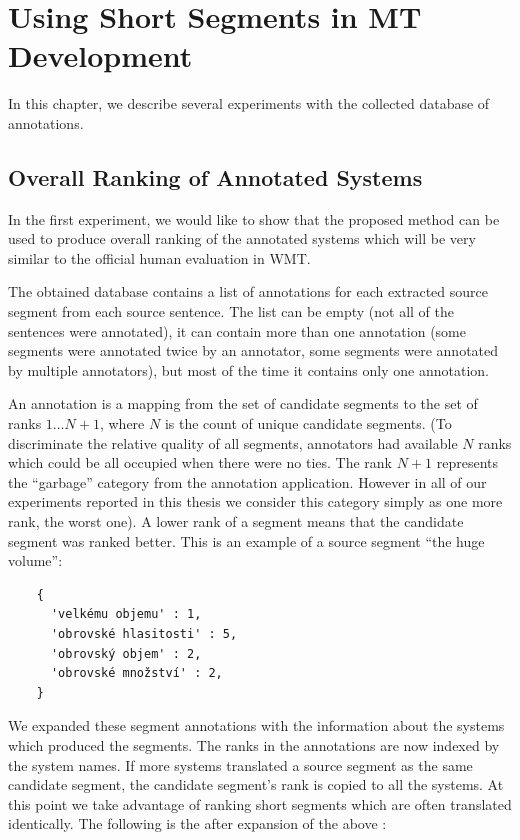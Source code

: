 \chapter{Using Short Segments in MT Development}
\label{chapter:experiments}

In this chapter, we describe several experiments with the collected database of
annotations. 

\section{Overall Ranking of Annotated Systems}
\label{evaluating-annotated-systems}

In the first experiment, we would like to show that the proposed method can be
used to produce overall ranking of the annotated systems which will be very
similar to the official human evaluation in WMT.

The obtained database contains a list of annotations for each extracted source
segment from each source sentence. The list can be empty (not all of the
sentences were annotated), it can contain more than one annotation (some
segments were annotated twice by an annotator, some segments were annotated by
multiple annotators), but most of the time it contains only one annotation.

An annotation is a mapping from the set of candidate segments to the set of
ranks ${1 \ldots N+1}$, where $N$ is the count of unique candidate segments.
(To discriminate the relative quality of all segments, annotators had available
$N$ ranks which could be all occupied when there were no ties. The rank $N+1$
represents the ``garbage'' category from the annotation application. However in
all of our experiments reported in this thesis we consider this category simply as one
more rank, the worst one). A lower rank of a segment means that the candidate
segment was ranked better. This is an example  of a
source segment ``the huge volume'':

\begin{verbatim}
    {
      'velkému objemu' : 1,
      'obrovské hlasitosti' : 5,
      'obrovský objem' : 2,
      'obrovské množství' : 2,
    }
\end{verbatim}

We expanded these segment annotations with the information about the systems
which produced the segments. The ranks in the annotations are now indexed by
the system names.  If more systems translated a source segment as the same
candidate segment, the candidate segment's rank is copied to all the systems.
At this point we take advantage of ranking short segments which are
often translated identically.  The following is the 
after expansion of the above :

